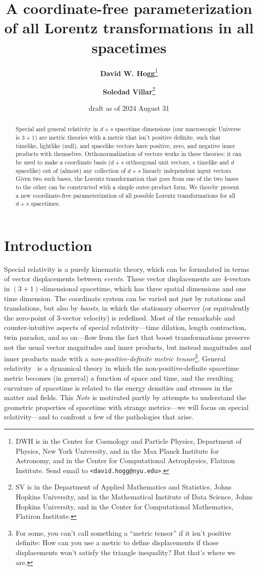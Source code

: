 \documentclass{article}
\title{\bfseries A coordinate-free parameterization of all Lorentz transformations in all spacetimes}
\author{\textbf{David W. Hogg}\footnote{DWH is in the Center for Cosmology and Particle Physics, Department of Physics, New York University, and in the Max Planck Institute for Astronomy, and in the Center for Computational Astrophysics, Flatiron Institute. Send email to \texttt{<david.hogg@nyu.edu>}.}
        \and
        \textbf{Soledad Villar}\footnote{SV is in the Department of Applied Mathematics and Statistics, Johns Hopkins University, and in the Mathematical Institute of Data Science, Johns Hopkins University, and in the Center for Computational Mathematics, Flatiron Institute.}}
\date{draft as of 2024 August 31}
\newcommand{\plus}{\!+\!} %
\newcommand{\documentname}{\textsl{Note}}
\begin{document}
\thispagestyle{plain}
\maketitle

\begin{abstract}\noindent %
    Special and general relativity in $d+s$ spacetime dimensions (our macroscopic Universe is $3+1$) are metric theories with a metric that isn't positive definite, such that timelike, lightlike (null), and spacelike vectors have positive, zero, and negative inner products with themselves.
    Orthonormalization of vectors works in these theories; it can be used to make a coordinate basis ($d+s$ orthoogonal unit vectors, $s$ timelike and $d$ spacelike) out of (almost) any collection of $d+s$ linearly independent input vectors.
    Given two such bases, the Lorentz transformation that goes from one of the two bases to the other can be constructed with a simple outer-product form.
    We thereby present a new coordinate-free parameterization of all possible Lorentz transformations for all $d+s$ spacetimes.
\end{abstract}

\section{Introduction}\label{sec:intro}

Special relativity \cite{sr} is a purely kinematic theory, which can be formulated in terms of vector displacements between \emph{events}.
These vector displacements are 4-vectors in $(3\plus1)$-dimensional spacetime, which has three spatial dimensions and one time dimension.
The coordinate system can be varied not just by rotations and translations, but also by \emph{boosts}, in which the stationary observer (or equivalently the zero-point of 3-vector velocity) is redefined.
Most of the remarkable and counter-intuitive aspects of special relativity---time dilation, length contraction, twin paradox, and so on---flow from the fact that boost transformations preserve not the usual vector magnitudes and inner products, but instead magnitudes and inner products made with a \emph{non-positive-definite metric tensor}\footnote{For some, you can't call something a ``metric tensor'' if it isn't positive definite: How can you use a metric to define displacements if those displacements won't satisfy the triangle inequality? But that's where we are.}.
General relativity~\cite{gr} is a dynamical theory in which the non-positive-definite spacetime metric becomes (in general) a function of space and time, and the resulting curvature of spacetime is related to the energy densities and stresses in the matter and fields.
This \documentname{} is motivated partly by attempts to understand the geometric properties of spacetime with strange metrics---we will focus on special relativity---and to confront a few of the pathologies that arise.
\end{document}
